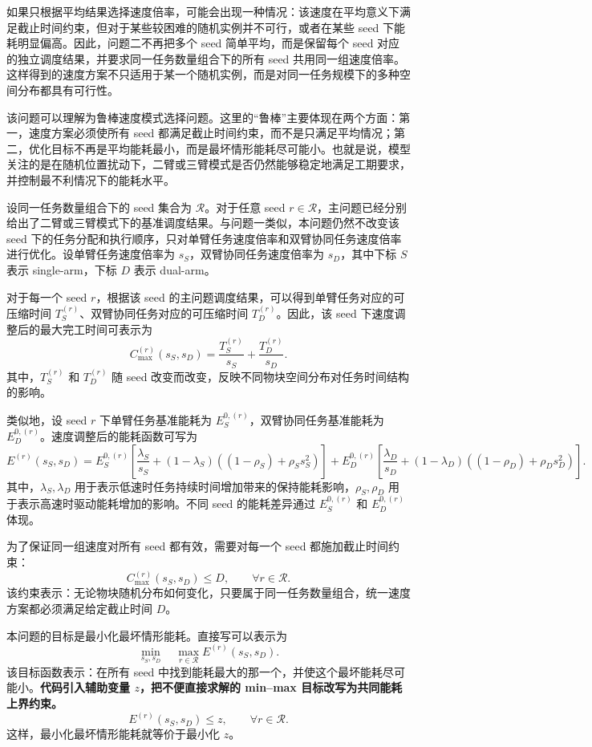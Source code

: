 如果只根据平均结果选择速度倍率，可能会出现一种情况：该速度在平均意义下满足截止时间约束，但对于某些较困难的随机实例并不可行，或者在某些 seed 下能耗明显偏高。因此，问题二不再把多个 seed 简单平均，而是保留每个 seed 对应的独立调度结果，并要求同一任务数量组合下的所有 seed 共用同一组速度倍率。这样得到的速度方案不只适用于某一个随机实例，而是对同一任务规模下的多种空间分布都具有可行性。

该问题可以理解为鲁棒速度模式选择问题。这里的“鲁棒”主要体现在两个方面：第一，速度方案必须使所有 seed 都满足截止时间约束，而不是只满足平均情况；第二，优化目标不再是平均能耗最小，而是最坏情形能耗尽可能小。也就是说，模型关注的是在随机位置扰动下，二臂或三臂模式是否仍然能够稳定地满足工期要求，并控制最不利情况下的能耗水平。

设同一任务数量组合下的 seed 集合为 $\mathcal{R}$。对于任意 seed $r\in\mathcal{R}$，主问题已经分别给出了二臂或三臂模式下的基准调度结果。与问题一类似，本问题仍然不改变该 seed 下的任务分配和执行顺序，只对单臂任务速度倍率和双臂协同任务速度倍率进行优化。设单臂任务速度倍率为 $s_S$，双臂协同任务速度倍率为 $s_D$，其中下标 $S$ 表示 single-arm，下标 $D$ 表示 dual-arm。

对于每一个 seed $r$，根据该 seed 的主问题调度结果，可以得到单臂任务对应的可压缩时间 $T_S^{(r)}$、双臂协同任务对应的可压缩时间 $T_D^{(r)}$。因此，该 seed 下速度调整后的最大完工时间可表示为
\[
C_{\max}^{(r)}(s_S,s_D)
=
\frac{T_S^{(r)}}{s_S}
+
\frac{T_D^{(r)}}{s_D}.
\]
其中，$T_S^{(r)}$ 和 $T_D^{(r)}$ 随 seed 改变而改变，反映不同物块空间分布对任务时间结构的影响。

类似地，设 seed $r$ 下单臂任务基准能耗为 $E_S^{0,(r)}$，双臂协同任务基准能耗为 $E_D^{0,(r)}$。速度调整后的能耗函数可写为
\[
E^{(r)}(s_S,s_D)
=
E_S^{0,(r)}
\left[
\frac{\lambda_S}{s_S}
+
(1-\lambda_S)
\left((1-\rho_S)+\rho_S s_S^2\right)
\right]
+
E_D^{0,(r)}
\left[
\frac{\lambda_D}{s_D}
+
(1-\lambda_D)
\left((1-\rho_D)+\rho_D s_D^2\right)
\right].
\]
其中，$\lambda_S,\lambda_D$ 用于表示低速时任务持续时间增加带来的保持能耗影响，$\rho_S,\rho_D$ 用于表示高速时驱动能耗增加的影响。不同 seed 的能耗差异通过 $E_S^{0,(r)}$ 和 $E_D^{0,(r)}$ 体现。

为了保证同一组速度对所有 seed 都有效，需要对每一个 seed 都施加截止时间约束：
\[
C_{\max}^{(r)}(s_S,s_D)\leq D,
\qquad
\forall r\in\mathcal{R}.
\]
该约束表示：无论物块随机分布如何变化，只要属于同一任务数量组合，统一速度方案都必须满足给定截止时间 $D$。

本问题的目标是最小化最坏情形能耗。直接写可以表示为
\[
\min_{s_S,s_D}
\quad
\max_{r\in\mathcal{R}} E^{(r)}(s_S,s_D).
\]
该目标函数表示：在所有 seed 中找到能耗最大的那一个，并使这个最坏能耗尽可能小。\textbf{代码引入辅助变量 $z$，把不便直接求解的 min--max 目标改写为共同能耗上界约束。}
\[
E^{(r)}(s_S,s_D)\leq z,
\qquad
\forall r\in\mathcal{R}.
\]
这样，最小化最坏情形能耗就等价于最小化 $z$。


